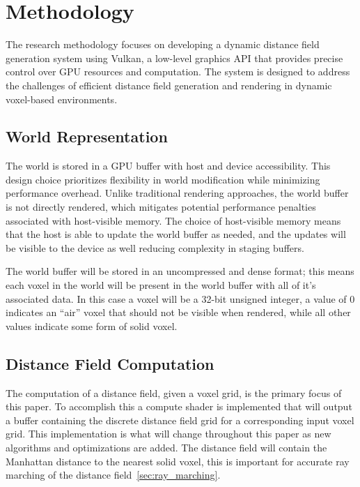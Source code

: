 \chapter{Methodology}
The research methodology focuses on developing a dynamic distance field generation system using Vulkan, a low-level
graphics API that provides precise control over GPU resources and computation. The system is designed to address the
challenges of efficient distance field generation and rendering in dynamic voxel-based environments.

\section{World Representation}
The world is stored in a GPU buffer with host and device accessibility. This design choice prioritizes flexibility in
world modification while minimizing performance overhead. Unlike traditional rendering approaches, the world buffer is
not directly rendered, which mitigates potential performance penalties associated with host-visible memory. The choice
of host-visible memory means that the host is able to update the world buffer as needed, and the updates will be visible
to the device as well reducing complexity in staging buffers.

The world buffer will be stored in an uncompressed and dense format; this means each voxel in the world will be
present in the world buffer with all of it's associated data. In this case a voxel will be a 32-bit unsigned integer, a
value of 0 indicates an ``air'' voxel that should not be visible when rendered, while all other values indicate some
form of solid voxel.

\section{Distance Field Computation}
The computation of a distance field, given a voxel grid, is the primary focus of this paper. To accomplish this a
compute shader is implemented that will output a buffer containing the discrete distance field grid for a corresponding
input voxel grid. This implementation is what will change throughout this paper as new algorithms and optimizations are
added. The distance field will contain the Manhattan distance to the nearest solid voxel, this is important for accurate
ray marching of the distance field~\ref{sec:ray_marching}.

